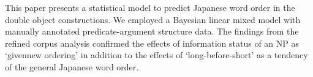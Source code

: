 This paper presents a statistical model to predict Japanese word order in the double object constructions. We employed a Bayesian linear mixed model with manually annotated predicate-argument structure data. The findings from the refined corpus analysis confirmed the effects of information status of an NP as ‘givennew ordering' in addition to the effects of ‘long-before-short' as a tendency of the general Japanese word order.
